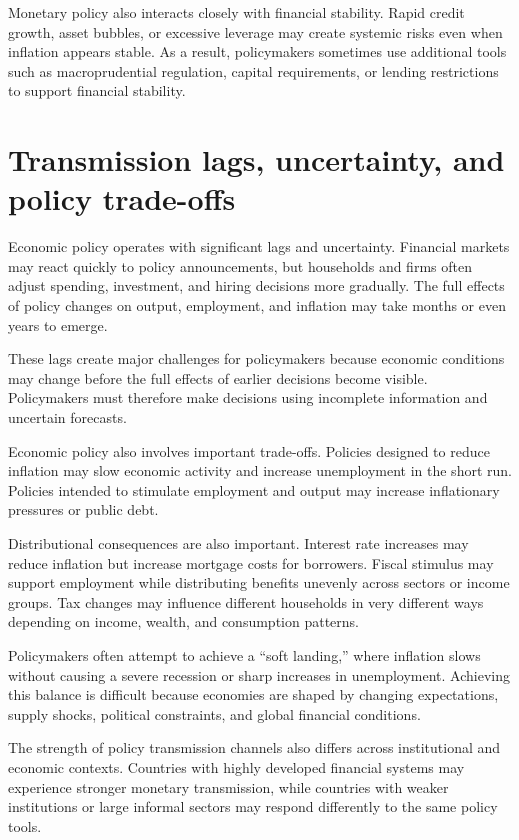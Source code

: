 \documentclass[
  11pt,
  oneside]{book}
\begin{document}
Monetary policy also interacts closely with financial stability. Rapid credit growth, asset bubbles, or excessive leverage may create systemic risks even when inflation appears stable. As a result, policymakers sometimes use additional tools such as macroprudential regulation, capital requirements, or lending restrictions to support financial stability.

\section{Transmission lags, uncertainty, and policy trade-offs}\label{transmission-lags-uncertainty-and-policy-trade-offs}

Economic policy operates with significant lags and uncertainty. Financial markets may react quickly to policy announcements, but households and firms often adjust spending, investment, and hiring decisions more gradually. The full effects of policy changes on output, employment, and inflation may take months or even years to emerge.

These lags create major challenges for policymakers because economic conditions may change before the full effects of earlier decisions become visible. Policymakers must therefore make decisions using incomplete information and uncertain forecasts.

Economic policy also involves important trade-offs. Policies designed to reduce inflation may slow economic activity and increase unemployment in the short run. Policies intended to stimulate employment and output may increase inflationary pressures or public debt.

Distributional consequences are also important. Interest rate increases may reduce inflation but increase mortgage costs for borrowers. Fiscal stimulus may support employment while distributing benefits unevenly across sectors or income groups. Tax changes may influence different households in very different ways depending on income, wealth, and consumption patterns.

Policymakers often attempt to achieve a ``soft landing,'' where inflation slows without causing a severe recession or sharp increases in unemployment. Achieving this balance is difficult because economies are shaped by changing expectations, supply shocks, political constraints, and global financial conditions.

The strength of policy transmission channels also differs across institutional and economic contexts. Countries with highly developed financial systems may experience stronger monetary transmission, while countries with weaker institutions or large informal sectors may respond differently to the same policy tools.
\end{document}

